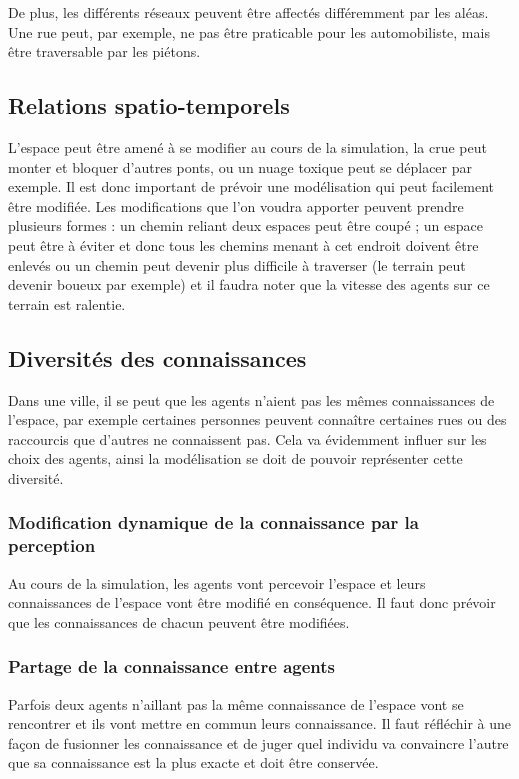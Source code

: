 \documentclass[a4paper]{article}
\begin{document}
  De plus, les différents réseaux peuvent être affectés différemment par les
  aléas. Une rue peut, par exemple, ne pas être praticable pour les
  automobiliste, mais être traversable par les piétons.

\subsection{Relations spatio-temporels}

L'espace peut être amené à se modifier au cours de la simulation, la crue peut
monter et bloquer d'autres ponts, ou un nuage toxique peut se déplacer par
exemple. Il est donc important de prévoir une modélisation qui peut facilement
être modifiée. Les modifications que l'on voudra apporter peuvent prendre
plusieurs formes : un chemin reliant deux espaces peut être coupé ; un espace
peut être à éviter et donc tous les chemins menant à cet endroit doivent être
enlevés ou un chemin peut devenir plus difficile à traverser (le terrain peut
devenir boueux par exemple) et il faudra noter que la vitesse des agents sur ce
terrain est ralentie.

\subsection{Diversités des connaissances}

Dans une ville, il se peut que les agents n'aient pas les mêmes connaissances de
l'espace, par exemple certaines personnes peuvent connaître certaines rues ou
des raccourcis que d'autres ne connaissent pas. Cela va évidemment influer sur
les choix des agents, ainsi la modélisation se doit de pouvoir représenter cette
diversité.

  \subsubsection{Modification dynamique de la connaissance par la perception}

  Au cours de la simulation, les agents vont percevoir l'espace et leurs
  connaissances de l'espace vont être modifié en conséquence. Il faut donc
  prévoir que les connaissances de chacun peuvent être modifiées.

  \subsubsection{Partage de la connaissance entre agents}

  Parfois deux agents n'aillant pas la même connaissance de l'espace vont se
  rencontrer et ils vont mettre en commun leurs connaissance. Il faut réfléchir
  à une façon de fusionner les connaissance et de juger quel individu va
  convaincre l'autre que sa connaissance est la plus exacte et doit être
  conservée.
\end{document}

